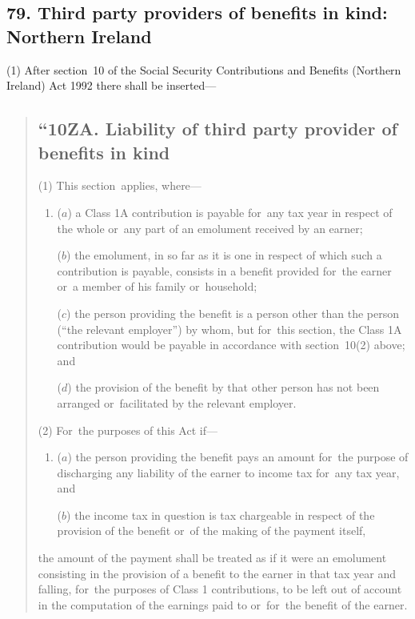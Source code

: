 \documentclass[12pt,a4paper]{article}
\begin{document}
\subsection{79. Third party providers of benefits in kind: Northern Ireland}

(1) After section~10 of the Social Security Contributions and Benefits (Northern Ireland) Act 1992 there shall be inserted—
\begin{quotation}
\subsection*{“10ZA. Liability of third party provider of benefits in kind}

(1) This section~applies, where—
\begin{enumerate}\item[]
($a$) a Class 1A contribution is payable for~any tax year in respect of the whole or~any part of an emolument received by an earner;

($b$) the emolument, in so far as it is one in respect of which such a contribution is payable, consists in a benefit provided for~the earner or~a member of his family or~household;

($c$) the person providing the benefit is a person other than the person (“the relevant employer”) by whom, but for~this section, the Class 1A contribution would be payable in accordance with section~10(2)  above; and

($d$) the provision of the benefit by that other person has not been arranged or~facilitated by the relevant employer.
\end{enumerate}

(2) For~the purposes of this Act if—
\begin{enumerate}\item[]
($a$) the person providing the benefit pays an amount for~the purpose of discharging any liability of the earner to income tax for~any tax year, and

($b$) the income tax in question is tax chargeable in respect of the provision of the benefit or~of the making of the payment itself,
\end{enumerate}
the amount of the payment shall be treated as if it were an emolument consisting in the provision of a benefit to the earner in that tax year and falling, for~the purposes of Class 1 contributions, to be left out of account in the computation of the earnings paid to or~for~the benefit of the earner.


\end{quotation}
\end{document}
